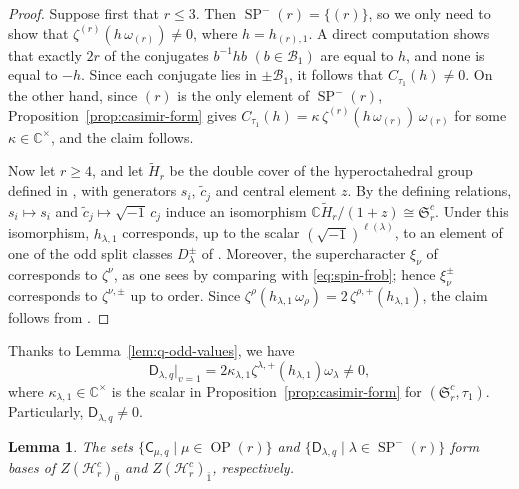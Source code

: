 \documentclass[11pt]{amsart}
\numberwithin{equation}{section}
\theoremstyle{plain}
\newtheorem{lem}[thm]{Lemma}
\theoremstyle{definition}
\theoremstyle{remark}
\begin{document}
\begin{proof}
Suppose first that $r\leq3$. Then $\operatorname{SP}^{-}(r)=\{(r)\}$, so we only need
to show that $\zeta^{(r)}(h\,\omega_{(r)})\neq0$, where $h=h_{(r),1}$.
A direct computation shows that exactly $2r$ of the conjugates $b^{-1}hb$
$(b\in\mathcal B_1)$ are equal to $h$, and none is equal to $-h$.
Since each conjugate lies in $\pm\mathcal B_1$, it follows that
$C_{\tau_1}(h)\neq0$. On the other hand, since $(r)$ is the only element of
$\operatorname{SP}^{-}(r)$, Proposition~\ref{prop:casimir-form} gives
$C_{\tau_1}(h)=\kappa\,\zeta^{(r)}(h\,\omega_{(r)})\,\omega_{(r)}$ for some
$\kappa\in\mathbb C^\times$, and the claim follows.

Now let $r\geq4$, and let $\tilde H_r$ be the double cover of the hyperoctahedral
group defined in \cite[(2.2)--(2.5)]{HJ17}, with generators $s_i$, $\tilde c_j$ and
central element $z$. By the defining relations, $s_i\mapsto s_i$ and
$\tilde c_j\mapsto\sqrt{-1}\,c_j$ induce an isomorphism
$\mathbb C\tilde H_r/(1+z)\cong\mathfrak S_r^c$.
Under this isomorphism, $h_{\lambda,1}$ corresponds, up to the scalar
$(\sqrt{-1})^{\ell(\lambda)}$, to an element of one of the odd split classes
$D^\pm_\lambda$ of \cite[\S3]{HJ17}. Moreover, the supercharacter $\xi_\nu$ of
\cite{HJ17} corresponds to $\zeta^\nu$, as one sees by comparing
\cite[(4.2)]{HJ17} with \eqref{eq:spin-frob}; hence $\xi^\pm_\nu$ corresponds to
$\zeta^{\nu,\pm}$ up to order. Since
$\zeta^\rho(h_{\lambda,1}\,\omega_\rho)=2\,\zeta^{\rho,+}(h_{\lambda,1})$, the claim
follows from \cite[Theorem~4.5]{HJ17}.
\end{proof}

Thanks to Lemma~\ref{lem:q-odd-values}, we have 
\begin{equation}\label{eq:Dv=1}
\mathsf D_{\lambda,q}|_{v=1}=2\kappa_{\lambda,1}
\zeta^{\lambda,+}(h_{\lambda,1})\omega_\lambda
\neq0,
\end{equation}
where $\kappa_{\lambda,1}\in\mathbb C^\times$ is the scalar in
Proposition~\ref{prop:casimir-form} for $(\mathfrak S_r^c,\tau_1)$. Particularly,
$\mathsf D_{\lambda,q}\neq 0$.


\begin{lem}\label{thm:hc-center-bases}
The sets
$\{\mathsf C_{\mu,q}\mid\mu\in\operatorname{OP}(r)\}$ and $\{\mathsf D_{\lambda,q}\mid\lambda\in\operatorname{SP}^{-}(r)\}$
form bases of $Z(\mathcal H_r^c)_{\bar{0}}$ and $Z(\mathcal H_r^c)_{\bar{1}}$, respectively.
\end{lem}
\end{document}
